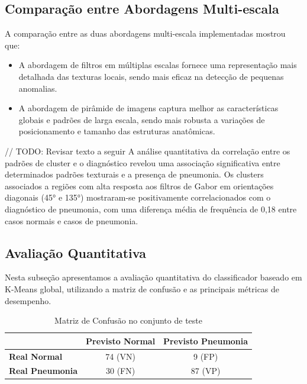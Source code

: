 \documentclass[sigconf,nonacm]{acmart}
\begin{document}
\subsection{Comparação entre Abordagens Multi-escala}

A comparação entre as duas abordagens multi-escala implementadas mostrou que:

\begin{itemize}
  \item A abordagem de filtros em múltiplas escalas fornece uma representação mais detalhada das texturas locais, sendo mais eficaz na detecção de pequenas anomalias.
  \item A abordagem de pirâmide de imagens captura melhor as características globais e padrões de larga escala, sendo mais robusta a variações de posicionamento e tamanho das estruturas anatômicas.
\end{itemize}

// TODO: Revisar texto a seguir
A análise quantitativa da correlação entre os padrões de cluster e o diagnóstico revelou uma associação significativa entre determinados padrões texturais e a presença de pneumonia. Os clusters associados a regiões com alta resposta aos filtros de Gabor em orientações diagonais (45° e 135°) mostraram-se positivamente correlacionados com o diagnóstico de pneumonia, com uma diferença média de frequência de 0,18 entre casos normais e casos de pneumonia.

\subsection{Avaliação Quantitativa}
Nesta subseção apresentamos a avaliação quantitativa do classificador baseado em K-Means global, utilizando a matriz de confusão e as principais métricas de desempenho.

\begin{table}[h]
  \centering
  \caption{Matriz de Confusão no conjunto de teste}
  \label{tab:confusion_matrix}
  \begin{tabular}{lcc}
    \toprule
                   & \textbf{Previsto Normal} & \textbf{Previsto Pneumonia} \\
    \midrule
    \textbf{Real Normal}     & 74 (VN)   & 9  (FP)  \\
    \textbf{Real Pneumonia}  & 30 (FN)   & 87 (VP)  \\
    \bottomrule
  \end{tabular}
\end{table}
\end{document}
